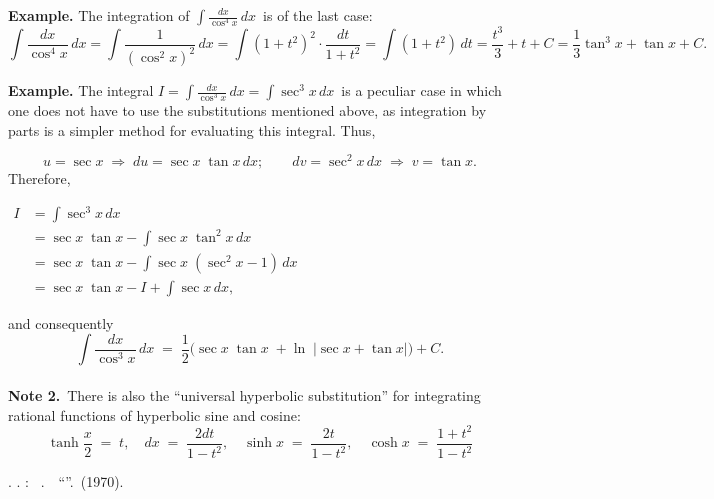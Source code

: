 \documentclass[12pt]{article}
\theoremstyle{definition}
\begin{document}
\textbf{Example.}\; The integration of\; $\displaystyle \int\!\frac{dx}{\cos^4{x}}\,dx$\, is of the last case:
$$\int\!\frac{dx}{\cos^4{x}}\,dx = \int\!\frac{1}{(\cos^2{x})^2}\,dx = \int\!(1+t^2)^2\cdot\frac{dt}{1+t^2} = 
\int\!(1+t^2)\,dt = \frac{t^3}{3}+t+C = \frac{1}{3}\tan^3{x}+\tan{x}+C.$$

\textbf{Example.}\; The integral \;$\displaystyle I = \int\!\frac{dx}{\cos^3{x}}\,dx = \int\! \sec^3{x}\,dx $\,
is a peculiar case in which one does not have to use the substitutions mentioned above, as integration by parts is a simpler method for evaluating this integral.  Thus,

$$u = \sec{x}\; \Rightarrow\; du = \sec{x}\;\tan{x}\,dx; \qquad dv = \sec^2{x}\,dx \; \Rightarrow \; v = \tan{x}.$$
Therefore,
\begin{center}
$\begin{array}{rl}
I & \displaystyle = \int\! \sec^3{x}\,dx \\
& \displaystyle = \sec{x}\;\tan{x} - \int\! \sec{x}\;\tan^2{x}\,dx \\
& \displaystyle = \sec{x}\;\tan{x} - \int\! \sec{x}\;(\sec^2{x}-1)\,dx \\
& \displaystyle = \sec{x}\;\tan{x} - I + \int\! \sec{x}\,dx, \end{array}$
\end{center}
and consequently
$$\int\!\frac{dx}{\cos^3{x}}\,dx \;=\; \frac{1}{2} \big(\sec{x}\;\tan{x}\;+\ln\;|\sec{x}+\tan{x}| \big)+C.$$\\

\textbf{Note 2.}\, There is also the ``universal hyperbolic substitution'' for integrating rational functions of hyperbolic sine and cosine:
$$\tanh\frac{x}{2} \;=\; t, \quad dx \;=\; \frac{2dt}{1\!-\!t^2}, \quad \sinh{x} \;=\; \frac{2t}{1\!-\!t^2}, \quad \cosh{x} \;=\; \frac{1\!+\!t^2}{1\!-\!t^2}$$

\begin{thebibliography}{7}
 \CYRL. \CYRD. \CYRK\cyr\cyrd\cyrr\cyrya\cyrch\cyre\cyrv: 
{\em \CYRM\cyra\cyrt\cyre\cyrm\cyra\cyrt\cyri\cyrch\cyre\cyrc\cyrk\cyri\cyri\, \cyra\cyrn\cyra\cyrl\cyri\cyrz}.\, \CYRI\cyrz\cyrd\cyra\cyrt\cyre\cyrl\cyrsftsn\cyrs\cyrt\cyrv\cyro \,
``\CYRV\cyry\cyrs\cyrsh\cyra\cyrya \CYRSH\cyrk\cyro\cyrl\cyra''. \CYRM\cyro\cyrs\cyrk\cyrv\cyra \,(1970).
\end{thebibliography}

\end{document}
